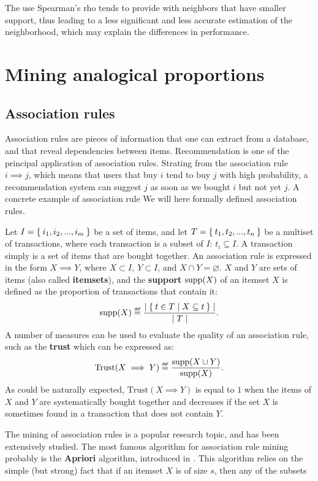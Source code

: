 The use Spearman's rho tends to provide with neighbors that have smaller
support, thus leading to a less significant and less accurate estimation of the
neighborhood, which may explain the differences in performance.

\section{Mining analogical proportions}

\subsection{Association rules}

Association rules are pieces of information that one can extract from a
database, and that reveal dependencies between items. Recommendation is one of
the principal application of association rules. Strating from the association
rule $i \implies j$, which means that users that buy $i$ tend to buy $j$ with
high probability, a recommendation system can suggest $j$ as soon as we bought
$i$ but not yet $j$. A concrete example of association rule We will here
formally defined association rules.

Let $I = \Set{i_1, i_2, ..., i_m}$ be a set of items, and let $T = \Set{t_1,
t_2, ..., t_n}$ be a multiset of transactions, where each transaction is a
subset of $I$: $t_i \subseteq I$. A transaction simply is a set of items that
are bought together. An association rule is expressed in the form $ X \implies
Y$, where $ X \subset I, ~ Y \subset I$, and $X \cap Y = \varnothing$. $X$ and
$ Y $ are sets of items (also called \textbf {itemsets}), and the
\textbf{support} $\text{supp} (X) $ of an itemset $X$ is defined as the proportion of
transactions that contain it:
$$\supp(X) \eqdef \frac{\mid \Set{t \in T | X \subseteq t}\mid}{\mid T \mid}.$$
A number of measures can be used to evaluate the quality of an
association rule, such as the \textbf{trust} which can be expressed as:
$$\text{Trust}(X \implies Y) \eqdef \frac{\supp (X \cup Y)}{\supp (X)}.$$
As could be naturally expected, $\text{Trust}(X \implies Y)$ is equal to $1$
when the items of $X$ and $Y$ are systematically bought together and decreases
if the set $X$ is sometimes found in a transaction that does not contain $Y$.

The mining of association rules is a popular research topic, and has been
extensively studied. The most famous algorithm for association rule mining
probably is the \textbf{Apriori} algorithm, introduced in \cite{AgrSriVLDB94}.
This algorithm relies on the simple (but strong) fact that if an itemset $X$ is
of size $s$, then any of the subsets

